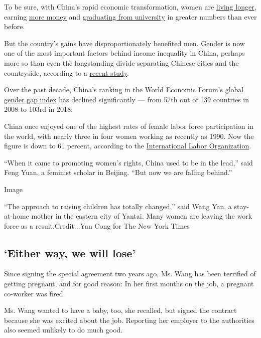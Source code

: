 To be sure, with China's rapid economic transformation, women are
\href{http://www.chinadaily.com.cn/china/2017-07/26/content_30256796.htm}{living
longer}, earning
\href{https://core.ac.uk/download/pdf/41447073.pdf}{more money} and
\href{https://www.1xuezhe.exuezhe.com/Qk/art/465154?dbcode=1\&flag=2\&logohome=1}{graduating
from university} in greater numbers than ever before.

But the country's gains have disproportionately benefited men. Gender is
now one of the most important factors behind income inequality in China,
perhaps more so than even the longstanding divide separating Chinese
cities and the countryside, according to a
\href{https://onlinelibrary.wiley.com/doi/10.1111/cwe.12266}{recent
study}.

Over the past decade, China's ranking in the World Economic Forum's
\href{http://www3.weforum.org/docs/WEF_GGGR_2018.pdf}{global gender gap
index} has declined significantly --- from 57th out of 139 countries in
2008 to 103rd in 2018.

China once enjoyed one of the highest rates of female labor force
participation in the world, with nearly three in four women working as
recently as 1990. Now the figure is down to 61 percent, according to the
\href{https://data.worldbank.org/indicator/sl.tlf.cact.fe.zs}{International
Labor Organization}.

``When it came to promoting women's rights, China used to be in the
lead,'' said Feng Yuan, a feminist scholar in Beijing. ``But now we are
falling behind.''

Image

``The approach to raising children has totally changed,'' said Wang Yan,
a stay-at-home mother in the eastern city of Yantai. Many women are
leaving the work force as a result.Credit...Yan Cong for The New York
Times

\hypertarget{either-way-we-will-lose}{%
\subsection{`Either way, we will lose'}\label{either-way-we-will-lose}}

Since signing the special agreement two years ago, Ms. Wang has been
terrified of getting pregnant, and for good reason: In her first months
on the job, a pregnant co-worker was fired.

Ms. Wang wanted to have a baby, too, she recalled, but signed the
contract because she was excited about the job. Reporting her employer
to the authorities also seemed unlikely to do much good.

